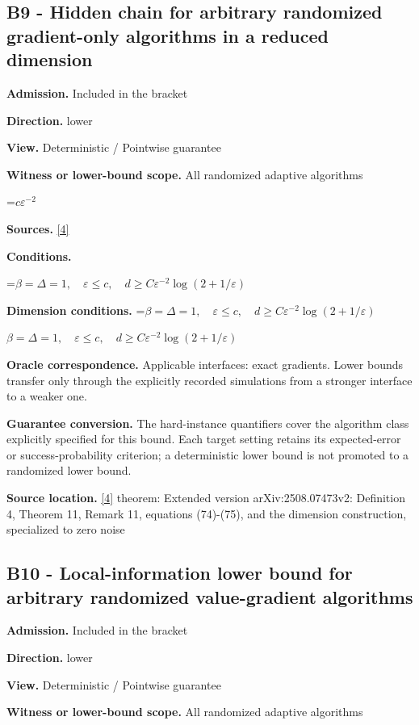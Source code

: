 \documentclass[10pt,a4paper]{article}
\newcommand{\AtlasMath}[1]{\par\begingroup\centering\setbox0=\hbox{$\displaystyle #1$}\ifdim\wd0>1.4\linewidth\typeout{ATLAS WIDE FORMULA: \the\wd0}\fi\ifdim\wd0>\linewidth\resizebox{\linewidth}{!}{\box0}\else\box0\fi\par\endgroup}
\newcommand{\AtlasInlineMath}[1]{\begingroup\setbox0=\hbox{$#1$}\ifdim\wd0>.4\linewidth\endgroup\AtlasMath{#1}\else\endgroup$#1$\fi}
\begin{document}
\subsection{B9 - Hidden chain for arbitrary randomized gradient-only algorithms in a reduced dimension}
\textbf{Admission.} Included in the bracket

\textbf{Direction.} lower

\textbf{View.} Deterministic / Pointwise guarantee

\textbf{Witness or lower-bound scope.} All randomized adaptive algorithms

\AtlasMath{c\varepsilon^{-2}}
\textbf{Sources.} \href{https://proceedings.mlr.press/v313/liu26a.html}{[4]}

\textbf{Conditions.} 


\AtlasMath{\beta=\Delta=1,\quad\varepsilon\le c,\quad d\ge C\varepsilon^{-2}\log(2+1/\varepsilon)}




\textbf{Dimension conditions.} \AtlasInlineMath{\beta=\Delta=1,\quad\varepsilon\le c,\quad d\ge C\varepsilon^{-2}\log(2+1/\varepsilon)}

\textbf{Oracle correspondence.} Applicable interfaces: exact gradients. Lower bounds transfer only through the explicitly recorded simulations from a stronger interface to a weaker one.

\textbf{Guarantee conversion.} The hard-instance quantifiers cover the algorithm class explicitly specified for this bound. Each target setting retains its expected-error or success-probability criterion; a deterministic lower bound is not promoted to a randomized lower bound.

\textbf{Source location.} \href{https://proceedings.mlr.press/v313/liu26a.html}{[4]} theorem: Extended version arXiv:2508.07473v2: Definition 4, Theorem 11, Remark 11, equations (74)-(75), and the dimension construction, specialized to zero noise

\subsection{B10 - Local-information lower bound for arbitrary randomized value-gradient algorithms}
\textbf{Admission.} Included in the bracket

\textbf{Direction.} lower

\textbf{View.} Deterministic / Pointwise guarantee

\textbf{Witness or lower-bound scope.} All randomized adaptive algorithms
\end{document}
